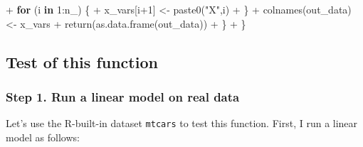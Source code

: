 \documentclass[
]{article}
\newenvironment{Shaded}{\begin{snugshade}}{\end{snugshade}}
\newcommand{\ControlFlowTok}[1]{\textcolor[rgb]{0.13,0.29,0.53}{\textbf{#1}}}
\newcommand{\DecValTok}[1]{\textcolor[rgb]{0.00,0.00,0.81}{#1}}
\newcommand{\FunctionTok}[1]{\textcolor[rgb]{0.00,0.00,0.00}{#1}}
\newcommand{\NormalTok}[1]{#1}
\newcommand{\OtherTok}[1]{\textcolor[rgb]{0.56,0.35,0.01}{#1}}
\newcommand{\SpecialCharTok}[1]{\textcolor[rgb]{0.00,0.00,0.00}{#1}}
\newcommand{\StringTok}[1]{\textcolor[rgb]{0.31,0.60,0.02}{#1}}
\begin{document}
\begin{Shaded}
\begin{Highlighting}[]
\SpecialCharTok{+}     \ControlFlowTok{for}\NormalTok{ (i }\ControlFlowTok{in} \DecValTok{1}\SpecialCharTok{:}\NormalTok{n\_) \{}
\SpecialCharTok{+}\NormalTok{       x\_vars[i}\SpecialCharTok{+}\DecValTok{1}\NormalTok{] }\OtherTok{\textless{}{-}} \FunctionTok{paste0}\NormalTok{(}\StringTok{"X"}\NormalTok{,i)}
\SpecialCharTok{+}\NormalTok{     \}}
\SpecialCharTok{+}     \FunctionTok{colnames}\NormalTok{(out\_data) }\OtherTok{\textless{}{-}}\NormalTok{ x\_vars}
\SpecialCharTok{+}     \FunctionTok{return}\NormalTok{(}\FunctionTok{as.data.frame}\NormalTok{(out\_data))}
\SpecialCharTok{+}\NormalTok{   \}}
\SpecialCharTok{+}\NormalTok{ \}}
\end{Highlighting}
\end{Shaded}

\hypertarget{test-of-this-function}{%
\subsection{Test of this function}\label{test-of-this-function}}

\hypertarget{step-1.-run-a-linear-model-on-real-data}{%
\subsubsection{Step 1. Run a linear model on real
data}\label{step-1.-run-a-linear-model-on-real-data}}

Let's use the R-built-in dataset \texttt{mtcars} to test this function.
First, I run a linear model as follows:
\end{document}
